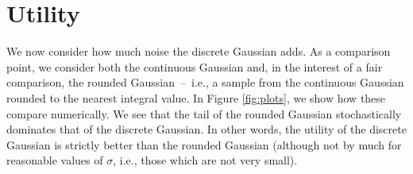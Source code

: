 \documentclass{jpcfinal} %
\begin{document}
\section{Utility}
\label{sec:utility}

We now consider how much noise the discrete Gaussian adds. As a comparison point, we consider both the continuous Gaussian and, in the interest of a fair comparison, the rounded Gaussian~--~i.e., a sample from the continuous Gaussian rounded to the nearest integral value.
In Figure \ref{fig:plots}, we show how these compare numerically. We see that the tail of the rounded Gaussian stochastically dominates that of the discrete Gaussian. In other words, the utility of the discrete Gaussian is strictly better than the rounded Gaussian (although not by much for reasonable values of $\sigma$, i.e., those which are not very small).
\end{document}
